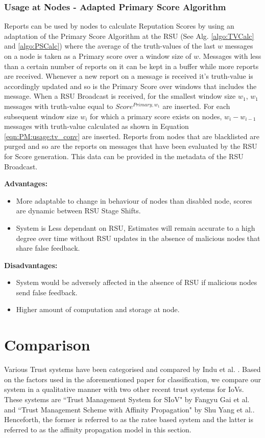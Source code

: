 \documentclass[journal]{IEEEtran}
\begin{document}
\subsubsection{Usage at Nodes - Adapted Primary Score Algorithm}
\label{sec:PM:usage:adapted@node}
Reports can be used by nodes to calculate Reputation Scores by using an adaptation of the Primary Score Algorithm at the RSU (See Alg. \ref{algo:TVCalc} and \ref{algo:PSCalc}) where the average of the truth-values of the last $ w $ messages on a node is taken as a Primary score over a window size of $ w $. Messages with less than a certain number of reports on it can be kept in a buffer while more reports are received. Whenever a new report on a message is received it's truth-value is accordingly updated and so is the Primary Score over windows that includes the message. When a RSU Broadcast is received, for the smallest window size $ w_1 $, $ w_1 $ messages with truth-value equal to $ Score^{Primary,w_1} $ are inserted. For each subsequent window size $ w_i $ for which a primary score exists on nodes, $ w_i - w_{i-1} $ messages with truth-value calculated as shown in Equation \ref{eqn:PM:usage:tv_conv} are inserted. Reports from nodes that are blacklisted are purged and so are the reports on messages that have been evaluated by the RSU for Score generation. This data can be provided in the metadata of the RSU Broadcast.

\textbf{Advantages:}
\begin{itemize}
	\item More adaptable to change in behaviour of nodes than disabled node, scores are dynamic between RSU Stage Shifts.
	\item System is Less dependant on RSU, Estimates will remain accurate to a high degree over time without RSU updates in the absence of malicious nodes that share false feedback.
\end{itemize}
\textbf{Disadvantages:} 
\begin{itemize}
	\item System would be adversely affected in the absence of RSU if malicious nodes send false feedback.
	\item Higher amount of computation and storage at node.
\end{itemize}
\section{Comparison}
\label{sec:comparison}
Various Trust systems have been categorised and compared by Indu et al. \cite{c:compareTrust}. Based on the factors used in the aforementioned paper for classification, we compare our system in a qualitative manner with two other recent trust systems for IoVs. These systems are ``Trust Management System for SIoV" by Fangyu Gai et al.\cite{c:trustSys_Ratee_Centralised_EntityBased} and  ``Trust Management Scheme with Affinity Propagation" by Shu Yang et al.\cite{c:trustSys_affinity_Distributed_DataBased}. Henceforth, the former is referred to as the ratee based system and the latter is referred to as the affinity propagation model in this section.
\end{document}
